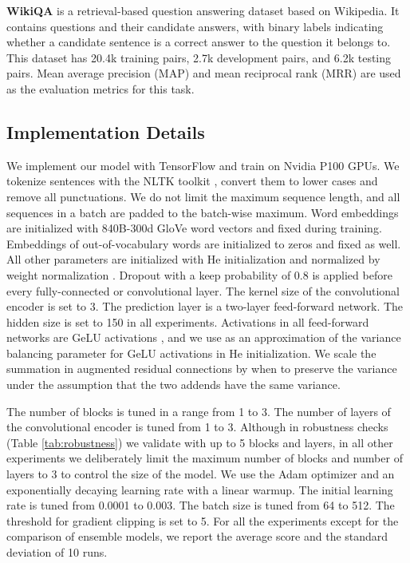 \documentclass[11pt,a4paper]{article}
\begin{document}
{\bf WikiQA} \cite{wikiqa} is a retrieval-based question answering dataset based on Wikipedia. It contains questions and their candidate answers, with binary labels indicating whether a candidate sentence is a correct answer to the question it belongs to. This dataset has 20.4k training pairs, 2.7k development pairs, and 6.2k testing pairs. Mean average precision (MAP) and mean reciprocal rank (MRR) are used as the evaluation metrics for this task.

\subsection{Implementation Details}
We implement our model with TensorFlow \cite{abadi2016tensorflow} and train on Nvidia P100 GPUs. We tokenize sentences with the NLTK toolkit \cite{bird2009natural}, convert them to lower cases and remove all punctuations. We do not limit the maximum sequence length, and all sequences in a batch are padded to the batch-wise maximum.
Word embeddings are initialized with 840B-300d GloVe word vectors \cite{pennington2014glove} and fixed during training. Embeddings of out-of-vocabulary words are initialized to zeros and fixed as well. All other parameters are initialized with He initialization \cite{he2015delving} and normalized by weight normalization \cite{salimans2016weight}. 
Dropout with a keep probability of 0.8 is applied before every fully-connected or convolutional layer. The kernel size of the convolutional encoder is set to 3. The prediction layer is a two-layer feed-forward network. The hidden size is set to 150 in all experiments. Activations in all feed-forward networks are GeLU activations \cite{hendrycks2016bridging}, and we use  as an approximation of the variance balancing parameter for GeLU activations in He initialization. We scale the summation in augmented residual connections by  when  to preserve the variance under the assumption that the two addends have the same variance.

The number of blocks is tuned in a range from 1 to 3. The number of layers of the convolutional encoder is tuned from 1 to 3. Although in robustness checks (Table \ref{tab:robustness}) we validate with up to 5 blocks and layers, in all other experiments we deliberately limit the maximum number of blocks and number of layers to 3 to control the size of the model. We use the Adam optimizer \cite{kingma2015adam} and an exponentially decaying learning rate with a linear warmup. The initial learning rate is tuned from 0.0001 to 0.003. The batch size is tuned from 64 to 512. The threshold for gradient clipping is set to 5. For all the experiments except for the comparison of ensemble models, we report the average score and the standard deviation of 10 runs.
\end{document}
